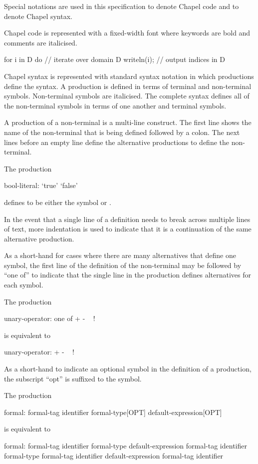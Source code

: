 \label{Notation}

Special notations are used in this specification to denote Chapel code
and to denote Chapel syntax.

Chapel code is represented with a fixed-width font where keywords are
bold and comments are italicised.
\begin{example}
\begin{chapel}
for i in D do   // iterate over domain D
  writeln(i);   // output indices in D
\end{chapel}
\end{example}

Chapel syntax is represented with standard syntax notation in which
productions define the syntax.  A production is defined in terms of
terminal and non-terminal symbols.  Non-terminal symbols are
italicised.  The complete syntax defines all of the non-terminal
symbols in terms of one another and terminal symbols.

A production of a non-terminal is a multi-line construct.  The first
line shows the name of the non-terminal that is being defined followed
by a colon.  The next lines before an empty line define the
alternative productions to define the non-terminal.
\begin{example}
The production
\begin{syntax}
bool-literal:
  `true'
  `false'
\end{syntax}
defines  to be either the symbol  or
.
\end{example}
In the event that a single line of a definition needs to break across
multiple lines of text, more indentation is used to indicate that it
is a continuation of the same alternative production.

As a short-hand for cases where there are many alternatives that
define one symbol, the first line of the definition of the
non-terminal may be followed by ``one of'' to indicate that the single
line in the production defines alternatives for each symbol.
\begin{example}
The production
\begin{syntax}
unary-operator: one of
  + - ~ !
\end{syntax}
is equivalent to
\begin{syntax}
unary-operator:
  +
  -
  ~
  !
\end{syntax}
\end{example}

As a short-hand to indicate an optional symbol in the definition of a
production, the subscript ``opt'' is suffixed to the symbol.
\begin{example}
The production
\begin{syntax}
formal:
  formal-tag identifier formal-type[OPT] default-expression[OPT]
\end{syntax}
is equivalent to
\begin{syntax}
formal:
  formal-tag identifier formal-type default-expression
  formal-tag identifier formal-type
  formal-tag identifier default-expression
  formal-tag identifier
\end{syntax}
\end{example}
